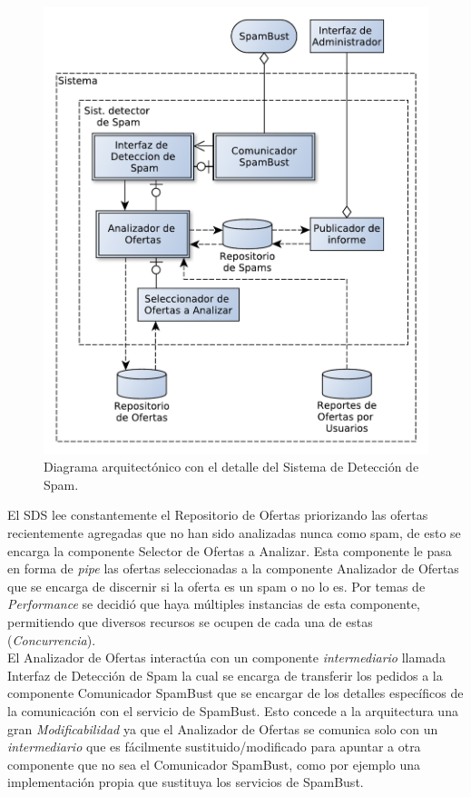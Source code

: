 \begin{figure}[H]
	\centering
	\includegraphics[width=\textwidth]{graficos/arch/Sistema_deteccion_spam.pdf}
	\caption{Diagrama arquitectónico con el detalle del \textsf{Sistema de Detección de Spam}.}
\end{figure}

El SDS lee constantemente el \textsf{Repositorio de Ofertas} priorizando las ofertas recientemente agregadas que no han sido analizadas nunca como spam, de esto se encarga la componente \textsf{Selector de Ofertas a Analizar}. Esta componente le pasa en forma de \emph{pipe} las ofertas seleccionadas a la componente \textsf{Analizador de Ofertas} que se encarga de discernir si la oferta es un spam o no lo es. Por temas de \emph{Performance} se decidió que haya múltiples instancias de esta componente, permitiendo que diversos recursos se ocupen de cada una de estas (\emph{Concurrencia}).\\

El \textsf{Analizador de Ofertas} interactúa con un componente \emph{intermediario} llamada \textsf{Interfaz de Detección de Spam} la cual se encarga de transferir los pedidos a la componente \textsf{Comunicador SpamBust} que se encargar de los detalles específicos de la comunicación con el servicio de \textsf{SpamBust}. Esto concede a la arquitectura una gran \emph{Modificabilidad} ya que el \textsf{Analizador de Ofertas} se comunica solo con un \emph{intermediario} que es fácilmente sustituido/modificado para apuntar a otra componente que no sea el \textsf{Comunicador SpamBust}, como por ejemplo una implementación propia que sustituya los servicios de SpamBust.\\

